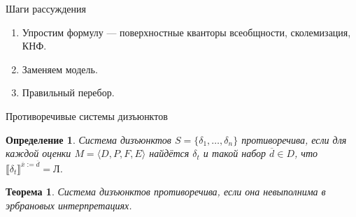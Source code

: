 \documentclass[aspectratio=169]{beamer}
\newtheorem{thm}{Теорема}[section]
\newtheorem{dfn}{Определение}[section]
\begin{document}
\begin{frame}{Шаги рассуждения}
\begin{enumerate}
\item \color{gray}Упростим формулу --- поверхностные кванторы всеобщности, сколемизация, КНФ.
\item \color{gray}Заменяем модель.
\item \color{black}Правильный перебор.
\end{enumerate}
\end{frame}

%

\begin{frame}{Противоречивые системы дизъюнктов}

\begin{dfn}Система дизъюнктов $S = \{\delta_1,\dots,\delta_n\}$ противоречива,
если для каждой оценки $M = \langle D,P,F,E \rangle$ найдётся $\delta_t$ и такой набор $\overline{d} \in D$,
что $\llbracket\delta_t\rrbracket^{\overline{x} := \overline{d}} = \text{Л}$.
\end{dfn}

\begin{thm}Система дизъюнктов противоречива, если она невыполнима в эрбрановых интерпретациях.\end{thm}
\end{frame}
\end{document}
